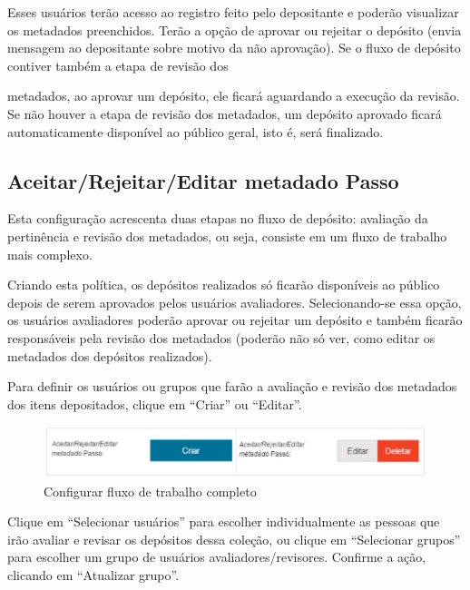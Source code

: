 \documentclass[12pt,hidelinks]{article}
\begin{document}
    Esses usuários terão acesso ao registro feito pelo depositante e poderão visualizar os metadados preenchidos. Terão a opção de aprovar ou rejeitar o depósito (envia mensagem ao depositante sobre motivo da não aprovação). Se o fluxo de depósito contiver também a etapa de revisão dos

\newpage

    metadados, ao aprovar um depósito, ele ficará aguardando a execução da revisão. Se não houver a etapa de revisão dos metadados, um depósito aprovado ficará automaticamente disponível ao público geral, isto é, será finalizado.
    
    \subsection{Aceitar/Rejeitar/Editar metadado Passo}
    
    Esta configuração acrescenta duas etapas no fluxo de depósito: avaliação da pertinência e revisão dos metadados, ou seja, consiste em um fluxo de trabalho mais complexo.
    
    \singlespacing
    
    Criando esta política, os depósitos realizados só ficarão disponíveis ao público depois de serem aprovados pelos usuários avaliadores. Selecionando-se essa opção, os usuários avaliadores poderão aprovar ou rejeitar um depósito e também ficarão responsáveis pela revisão dos metadados (poderão não só ver, como editar os metadados dos depósitos realizados).
    
    \singlespacing
    
    Para definir os usuários ou grupos que farão a avaliação e revisão dos metadados dos itens depositados, clique em “Criar” ou “Editar”.
    
    \begin{figure}[!htp]
                \centering
                \includegraphics[scale=0.7]{figura/Figura46.png}
                \caption{Configurar fluxo de trabalho completo}
            \label{Rotulo}
        \end{figure}
    
    Clique em “Selecionar usuários” para escolher individualmente as pessoas que irão avaliar e revisar os depósitos dessa coleção, ou clique em “Selecionar grupos” para escolher um grupo de usuários avaliadores/revisores. Confirme a ação, clicando em “Atualizar grupo”.
    
\end{document}
